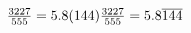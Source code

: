\begin{equation} 

$$\frac{3227}{555} = 5.8(144)$$
$$\frac{3227}{555} = 5.8 \overline {144}$$

\end{equation}



